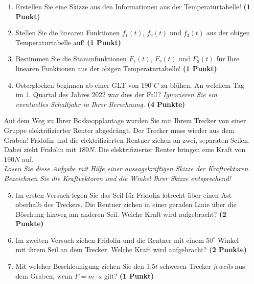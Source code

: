 \documentclass[a4paper, 9pt]{scrartcl}\usepackage[]{graphicx}\usepackage[]{xcolor}
\begin{document}
\begin{enumerate}
\item Erstellen Sie eine Skizze aus den Informationen aus der
  Temperaturtabelle!  \textbf{(1 Punkt)}
\item Stellen Sie die linearen Funktionen $f_1(t)$, $f_2(t)$ und
  $f_3(t)$ aus der obigen Temperaturtabelle auf!  \textbf{(1 Punkt)}
\item Bestimmen Sie die Stammfunktionen $F_1(t)$, $F_2(t)$ und $F_3(t)$ f{\"u}r
  Ihre linearen Funktionen aus der obigen Temperaturtabelle!  \textbf{(1
    Punkt)}
\item Osterglocken beginnen ab einer GLT von 190$^\circ C$ zu bl{\"u}hen. An
  welchem Tag im 1. Quartal des Jahres 2022 war dies der
  Fall? \textit{Ignorieren Sie ein eventuelles Schaltjahr in Ihrer Berechnung.} \textbf{(4 Punkte)}
\end{enumerate}

Auf dem Weg zu Ihrer Boskoopplantage wurden Sie mit Ihrem Trecker von
einer Gruppe elektrifizierter Renter abgedr{\"a}ngt. Der Trecker muss wieder
aus dem Graben! Fridolin und die elektrifizierten Rentner ziehen an zwei,
separaten Seilen. Dabei zieht Fridolin mit $180N$. Die
elektrifizierter Renter  bringen eine Kraft von $190N$ auf.\\

\textit{L{\"o}sen Sie diese Aufgabe mit Hilfe einer aussagekr{\"a}ftigen Skizze der
  Kraftvektoren. Bezeichnen Sie die Kraftvektoren und die Winkel Ihrer
  Skizze entsprechend!}

\begin{enumerate}
  \setcounter{enumi}{4}  
\item Im ersten Versuch legen Sie das Seil f{\"u}r Fridolin lotrecht {\"u}ber einen
  Ast oberhalb des Treckers. Die Rentner ziehen in einer geraden Linie {\"u}ber
  die B{\"o}schung hinweg am anderen Seil. Welche Kraft wird aufgebracht?
  \textbf{(2 Punkte)}
\item Im zweiten Versuch ziehen Fridolin und die Rentner mit einem
  $50^\circ$ Winkel mit ihrem Seil an dem Trecker. Welche Kraft
  wird aufgebracht? \textbf{(2 Punkte)}
\item Mit welcher Beschleunigung ziehen Sie den $1.5t$ schweren
  Trecker \textit{jeweils} aus dem Graben, wenn $F = m \cdot a$ gilt?
  \textbf{(1 Punkt)}
\end{enumerate}

 
\clearpage
\end{document}
